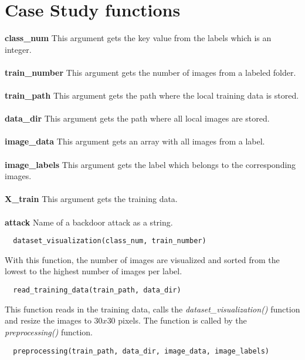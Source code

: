 \section{Case Study functions}
\label{sec:case_study_functions}

\textbf{class\_num}
This argument gets the key value from the labels which is an integer. \\ \\
\textbf{train\_number}
This argument gets the number of images from a labeled folder. \\ \\
\textbf{train\_path}
This argument gets the path where the local training data is stored. \\ \\
\textbf{data\_dir}
This argument gets the path where all local images are stored. \\ \\
\textbf{image\_data}
This argument gets an array with all images from a label. \\ \\
\textbf{image\_labels}
This argument gets the label which belongs to the corresponding images. \\ \\
\textbf{X\_train}
This argument gets the training data. \\ \\
\textbf{attack}
Name of a backdoor attack as a string. \\

\begin{lstlisting}
  dataset_visualization(class_num, train_number)
\end{lstlisting}

\noindent With this function, the number of images are visualized and sorted from the lowest to the highest number of images per label.

\begin{lstlisting}
  read_training_data(train_path, data_dir)
\end{lstlisting}

\noindent This function reads in the training data, calls the \textit{dataset\_visualization()} function and resize the images to $30x30$ pixels. The function is called by the \textit{preprocessing()} function.

\begin{lstlisting}
  preprocessing(train_path, data_dir, image_data, image_labels)
\end{lstlisting}

